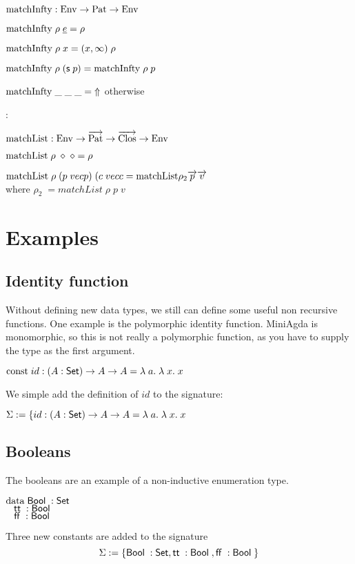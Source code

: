 \begin{description}
\begin{description}
\item
$\mathrm{matchInfty} : \mathrm{Env} \rightarrow \mathrm{Pat} \rightarrow \mathrm{Env}$
\item
$\mathrm{matchInfty} \; \rho \; \underline{e} = \rho$
\item
$\mathrm{matchInfty} \; \rho \; x = (x,\infty)\; \rho$
\item
$\mathrm{matchInfty} \; \rho \; (\mathsf{s}\; p)  = \mathrm{matchInfty} \; \rho \; p$
\item
$\mathrm{matchInfty} \; \_ \; \_ \; \_ = \;\Uparrow $ otherwise
\end{description}
\item[pattern matching list]:
\begin{description}
\item
$\mathrm{matchList} : \mathrm{Env} \rightarrow \overrightarrow{\mathrm{Pat}} \rightarrow \overrightarrow{\mathrm{Clos}} \rightarrow \mathrm{Env}  $
\item
$\mathrm{matchList} \; \rho \; \diamond \; \diamond = \rho $
\item
$\mathrm{matchList} \; \rho \; (p \; vec{p}) \; (c \; vec{c} = \mathrm{matchList} \rho_2 \overrightarrow{p} \overrightarrow{v} $\\
where $ \rho_2 \; = matchList \; \rho \; p \; v $
\end{description}

\end{description}
\section{Examples}
\subsection{Identity function}
Without defining new data types, we still can define some useful non recursive functions.
One example is the polymorphic identity function. 
MiniAgda is monomorphic, so this is not really a polymorphic function, as you have to supply the
type as the first argument.
\begin{bsp}
$\mathrm{const}\; id : ( A : \mathsf{Set} ) \rightarrow{A \rightarrow A} = \lambda\; a .\;\lambda\; x .\;x$   
\end{bsp}
We simple add the definition of $id$ to the signature:
\begin{bsp}
$\mathrm{\Sigma} := \{ id : ( A : \mathsf{Set} ) \rightarrow{A \rightarrow A} = \lambda\; a .\;\lambda\; x .\;x$
\end{bsp}
\subsection{Booleans}
The booleans are an example of a non-inductive enumeration type.
\begin{bsp}
$\mathrm{data}\; \mathsf{Bool}\; : \mathsf{Set}$  \\
$\hspace*{3mm} \mathsf{tt}\; : \mathsf{Bool}\; $\\
$\hspace*{3mm} \mathsf{ff}\; : \mathsf{Bool}\; $
\end{bsp}
Three new constants are added to the signature
\[ \mathrm{\Sigma} := \{ \mathsf{Bool}\; : \mathsf{Set} , \mathsf{tt}\; : \mathsf{Bool}\; , \mathsf{ff}\; : \mathsf{Bool}\; \} \]

